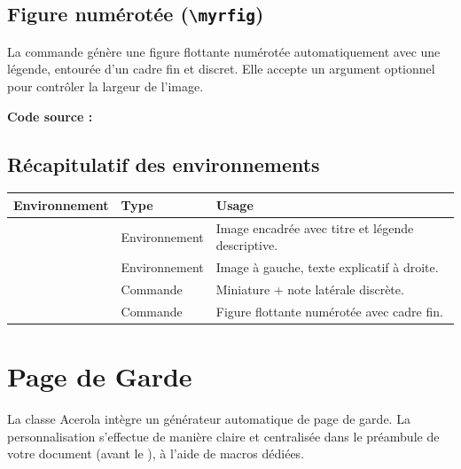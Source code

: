 \subsection{Figure numérotée (\texttt{\textbackslash myrfig})}

La commande  génère une figure flottante numérotée automatiquement avec une légende, entourée d'un cadre fin et discret. Elle accepte un argument optionnel pour contrôler la largeur de l'image.


\textbf{Code source :}
\begin{texblock}

\end{texblock}

\subsection{Récapitulatif des environnements}

\vspace{10pt}
\begin{tabularx}{\textwidth}{L{3.5cm} L{3.5cm} X}
    \toprule
    \textbf{Environnement} & \textbf{Type} & \textbf{Usage} \\
    \midrule
     & Environnement & Image encadrée avec titre et légende descriptive. \\
     & Environnement & Image à gauche, texte explicatif à droite. \\
     & Commande & Miniature + note latérale discrète. \\
     & Commande & Figure flottante numérotée avec cadre fin. \\
    \bottomrule
\end{tabularx}
\section{Page de Garde}

La classe Acerola intègre un générateur automatique de page de garde. La personnalisation s'effectue de manière claire et centralisée dans le préambule de votre document (avant le ), à l'aide de macros dédiées.

